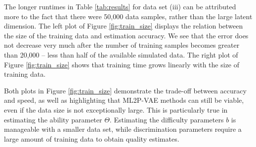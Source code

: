The longer runtimes in Table \ref{tab:results} for data set (iii) can be attributed more to the fact that there were 50,000 data samples, rather than the large latent dimension. The left plot of Figure \ref{fig:train_size} displays the relation between the size of the training data and estimation accuracy. We see that the error does not decrease very much after the number of training samples becomes greater than 20,000 -- less than half of the available simulated data. The right plot of Figure \ref{fig:train_size} shows that training time grows linearly with the size of training data. 

Both plots in Figure \ref{fig:train_size} demonstrate the trade-off between accuracy and speed, as well as highlighting that ML2P-VAE methods can still be viable, even if the data size is not exceptionally large. This is particularly true in estimating the ability parameter $\Theta$. Estimating the difficulty parameters $b$ is manageable with a smaller data set, while discrimination parameters require a large amount of training data to obtain quality estimates.



